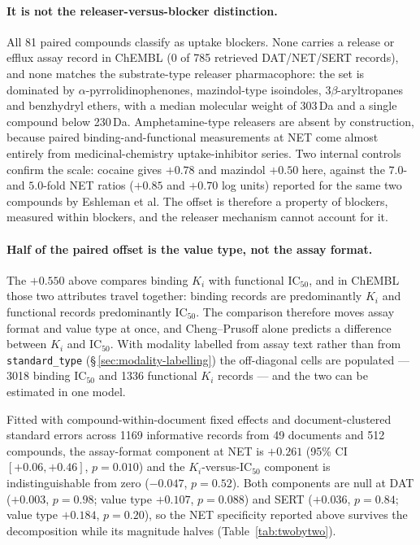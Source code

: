 \documentclass[11pt,a4paper]{article}
\begin{document}
\paragraph{It is not the releaser-versus-blocker distinction.} All 81 paired compounds
classify as uptake blockers. None carries a release or efflux assay record in ChEMBL
(0 of 785 retrieved DAT/NET/SERT records), and none matches the substrate-type releaser
pharmacophore: the set is dominated by $\alpha$-pyrrolidinophenones, mazindol-type
isoindoles, 3$\beta$-aryltropanes and benzhydryl ethers, with a median molecular weight
of 303\,Da and a single compound below 230\,Da. Amphetamine-type releasers are absent
by construction, because paired binding-and-functional measurements at NET come almost
entirely from medicinal-chemistry uptake-inhibitor series. Two internal controls
confirm the scale: cocaine gives $+0.78$ and mazindol $+0.50$ here, against the $7.0$-
and $5.0$-fold NET ratios ($+0.85$ and $+0.70$ log units) reported for the same two
compounds by Eshleman et al.\cite{Eshleman2017} The offset is therefore a property of
blockers, measured within blockers, and the releaser mechanism cannot account for it.

\paragraph{Half of the paired offset is the value type, not the assay format.} The
$+0.550$ above compares binding $K_i$ with functional IC$_{50}$, and in ChEMBL those
two attributes travel together: binding records are predominantly $K_i$ and functional
records predominantly IC$_{50}$. The comparison therefore moves assay format and value
type at once, and Cheng--Prusoff alone predicts a difference between $K_i$ and
IC$_{50}$.\cite{Kalliokoski2013} With modality labelled from assay text rather than
from \texttt{standard\_type} (\S\,\ref{sec:modality-labelling}) the off-diagonal cells
are populated --- 3018 binding IC$_{50}$ and 1336 functional $K_i$ records --- and the
two can be estimated in one model.

Fitted with compound-within-document fixed effects and document-clustered standard
errors across 1169 informative records from 49 documents and 512 compounds, the
assay-format component at NET is $\mathbf{+0.261}$ (95\% CI $[+0.06,+0.46]$,
$p=0.010$) and the $K_i$-versus-IC$_{50}$ component is indistinguishable from zero
($-0.047$, $p=0.52$). Both components are null at DAT ($+0.003$, $p=0.98$; value type
$+0.107$, $p=0.088$) and SERT ($+0.036$, $p=0.84$; value type $+0.184$, $p=0.20$), so
the NET specificity reported above survives the decomposition while its magnitude
halves (Table~\ref{tab:twobytwo}).
\end{document}
